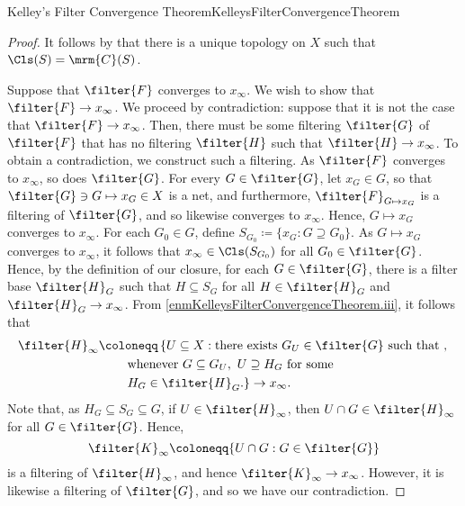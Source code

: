 \begin{thm}{Kelley's Filter Convergence Theorem}{KelleysFilterConvergenceTheorem}
\begin{proof}
It follows by  that there is a unique topology on $X$ such that $\Cls (S)=\mrm{C}(S)$.

Suppose that $\filter{F}$ converges to $x_{\infty}$.  We wish to show that $\filter{F}\to x_{\infty}$.  We proceed by contradiction:  suppose that it is not the case that $\filter{F}\to x_{\infty}$.  Then, there must be some filtering $\filter{G}$ of $\filter{F}$ that has no filtering $\filter{H}$ such that $\filter{H}\to x_{\infty}$.  To obtain a contradiction, we construct such a filtering.  As $\filter{F}$ converges to $x_{\infty}$, so does $\filter{G}$.  For every $G\in \filter{G}$, let $x_G\in G$, so that $\filter{G}\ni G\mapsto x_G\in X$ is a net, and furthermore, $\filter{F}_{G\mapsto x_G}$ is a filtering of $\filter{G}$, and so likewise converges to $x_{\infty}$.  Hence, $G\mapsto x_G$ converges to $x_{\infty}$.  For each $G_0\in G$, define $S_{G_0}\coloneqq \{ x_G:G\supseteq G_0\}$.  As $G\mapsto x_G$ converges to $x_{\infty}$, it follows that $x_{\infty}\in \Cls (S_{G_0})$ for all $G_0\in \filter{G}$.  Hence, by the definition of our closure, for each $G\in \filter{G}$, there is a filter base $\filter{H}_G$ such that $H\subseteq S_G$ for all $H\in \filter{H}_G$ and $\filter{H}_G\to x_{\infty}$.  From \cref{enmKelleysFilterConvergenceTheorem.iii}, it follows that
\begin{equation}
\begin{split}
\filter{H}_{\infty} & \coloneqq \left\{ U\subseteq X:\text{there exists }G_U\in \filter{G}\text{ such that ,} \right. \\
& \qquad \left. \text{whenever }G\subseteq G_U,\ U\supseteq H_G\text{ for some}\right. \\ & \qquad \left. H_G\in \filter{H}_G\text{.}\right\} \to x_{\infty}.
\end{split}
\end{equation}
Note that, as $H_G\subseteq S_G\subseteq G$, if $U\in \filter{H}_{\infty}$, then $U\cap G\in \filter{H}_{\infty}$ for all $G\in \filter{G}$.  Hence,
\begin{equation}
\filter{K}_{\infty}\coloneqq \{ U\cap G:G\in \filter{G}\}
\end{equation}
is a filtering of $\filter{H}_{\infty}$, and hence $\filter{K}_{\infty}\to x_{\infty}$.  However, it is likewise a filtering of $\filter{G}$, and so we have our contradiction.


\end{proof}
\end{thm}
